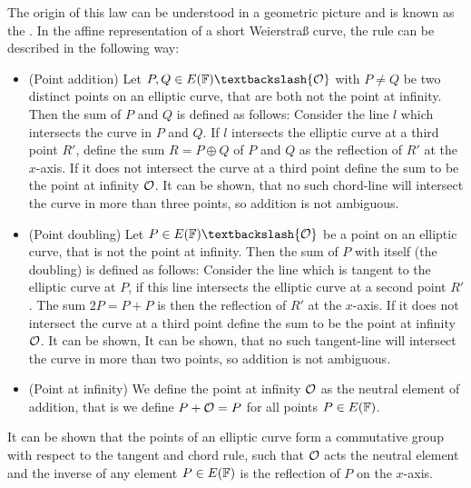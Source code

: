 The origin of this law can be understood in a geometric picture and is known as the . In the affine representation of a short Weierstraß curve, the rule can be described in the following way:
\begin{itemize}
\item (Point addition) Let $P, Q\in E(\F)\textbackslash \{\Oinf\}$ with $P\neq Q$ be two distinct points on an elliptic curve, that are both not the point at infinity. Then the sum of $P$ and $Q$ is defined as follows: Consider the line $l$ which intersects the curve in $P$ and $Q$. If $l$ intersects the elliptic curve at a third point $R'$, define the sum $R=P\oplus Q$ of $P$ and $Q$ as the reflection of $R'$ at the $x$-axis. If it does not intersect the curve at a third point define the sum to be the point at infinity $\mathcal{O}$. It can be shown, that no such chord-line will intersect the curve in more than three points, so addition is not ambiguous.
\item (Point doubling) Let $P \in E(\F)\textbackslash \{\Oinf\}$ be a point on an elliptic curve, that is not the point at infinity. Then the sum of $P$ with itself (the doubling) is defined as follows: Consider the line which is tangent to the elliptic curve at $P$, if this line intersects the elliptic curve at a second point $R'$. The sum $2P=P+P$ is then the reflection of $R'$ at the $x$-axis. If it does not intersect the curve at a third point define the sum to be the point at infinity $\mathcal{O}$. It can be shown, It can be shown, that no such tangent-line will intersect the curve in more than two points, so addition is not ambiguous.
\item (Point at infinity) We define the point at infinity $\mathcal{O}$ as the neutral element of addition, that is we define $P+\mathcal{O} = P$ for all points $P\in E(\mathbb{F})$.
\end{itemize}
It can be shown that the points of an elliptic curve form a commutative group with respect to the tangent and chord rule, such that $\mathcal{O}$ acts the neutral element and the inverse of any element $P\in E(\mathbb{F})$ is the reflection of $P$ on the $x$-axis.

